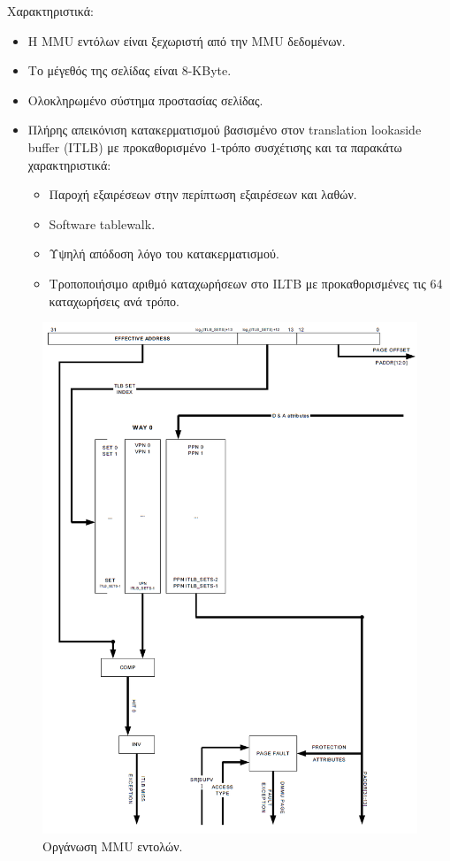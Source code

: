 \documentclass[a4paper,10pt]{article}
\numberwithin{figure}{section}
\numberwithin{table}{section}
\begin{document}
Χαρακτηριστικά:

\begin{itemize}
 \item H MMU εντόλων είναι ξεχωριστή από την MMU δεδομένων.
 \item Το μέγεθός της σελίδας είναι 8-KByte.
 \item Ολοκληρωμένο σύστημα προστασίας σελίδας.
 \item Πλήρης απεικόνιση κατακερματισμού βασισμένο στον translation lookaside buffer (ΙTLB)
με προκαθορισμένο 1-τρόπο συσχέτισης και τα παρακάτω χαρακτηριστικά:
	  \begin{itemize}
	      \item Παροχή εξαιρέσεων στην περίπτωση εξαιρέσεων και λαθών.
	      \item Software tablewalk.
	      \item Υψηλή απόδοση λόγο του κατακερματισμού.
	      \item Τροποποιήσιμο αριθμό καταχωρήσεων στο ILTB με προκαθορισμένες τις 64 καταχωρήσεις ανά τρόπο.
	  \end{itemize}
\end{itemize}

\newpage
\vspace{0.7cm}
\begin{figure}[h!]
 \centering
 \includegraphics[bb=0 0 891 1229,scale=0.38]{./Images/instruction_MMU.png}
 \caption{Οργάνωση MMU εντολών.}
\end{figure}
\vspace{0.7cm}
\end{document}
